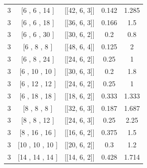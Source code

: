 \documentclass[%
reprint,
amsmath,amssymb,
aps,
]{revtex4-2}
\begin{document}
\begin{table}[b]
\begin{ruledtabular}
\begin{tabular}{|c|c|c|c|c|}
	3 & [6 , 6 , 14 ] & [[42, 6, 3]] & 0.142 & 1.285  \\
	3 & [6 , 6 , 18 ] & [[36, 6, 3]] & 0.166 & 1.5  \\
	3 & [6 , 6 , 30 ] & [[30, 6, 2]] & 0.2 & 0.8  \\
	3 & [6 , 8 , 8 ] & [[48, 6, 4]] & 0.125 & 2 \\
	3 & [6 , 8 , 24 ] & [[24, 6, 2]] & 0.25 & 1  \\
	3 & [6 , 10 , 10 ] & [[30, 6, 3]] & 0.2 & 1.8 \\
	3 & [6 , 12 , 12 ] & [[24, 6, 2]] & 0.25 & 1  \\
	3 & [6 , 18 , 18 ] & [[18, 6, 2]] & 0.333 & 1.333  \\
	3 & [8 , 8 , 8 ] & [[32, 6, 3]] & 0.187 & 1.687  \\
	3 & [8 , 8 , 12 ] & [[24, 6, 3]] & 0.25 & 2.25  \\
	3 & [8 , 16 , 16 ] & [[16, 6, 2]] & 0.375 & 1.5  \\
	3 & [10 , 10 , 10 ] & [[20, 6, 2]] & 0.3 & 1.2 \\
	3 & [14 , 14 , 14 ] & [[14, 6, 2]] & 0.428 & 1.714 \\
	\end{tabular}
\end{ruledtabular}
\end{table}
\end{document}
